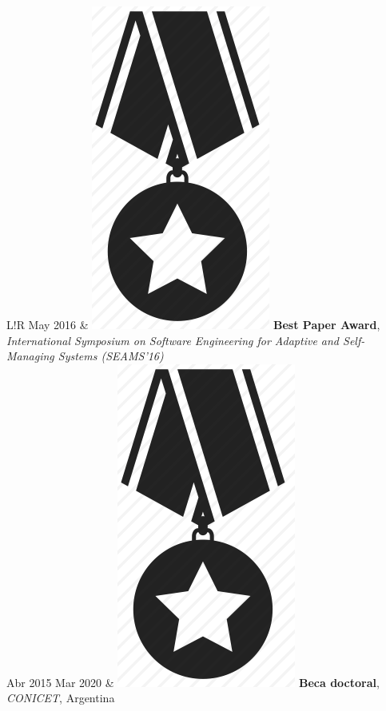 \documentclass[10pt]{article}
\newcommand\VRule{\color{lightgray}\vrule width 0.5pt}
\begin{document}
\begin{tabular}{L!{\VRule}R}
May 2016 & \includegraphics[scale=0.022]{../img/medal.png} 
\textbf{Best Paper Award}, 
\textit{International Symposium on Software Engineering for Adaptive and
Self-Managing Systems (SEAMS'16)}\\

Abr 2015 Mar 2020 & \includegraphics[scale=0.022]{../img/medal.png} 
\textbf{Beca doctoral}, \textit{CONICET}, Argentina\\


\end{tabular}
\end{document}

